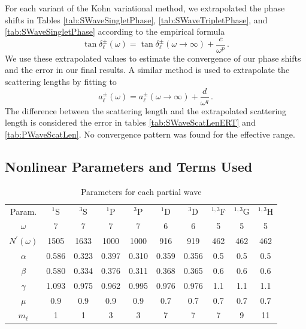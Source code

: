 \documentclass[reprint,showpacs,preprintnumbers,amsmath,amssymb,pra,aps]{revtex4-1}
\begin{document}
For each variant of the Kohn variational method, we extrapolated the phase shifts in Tables \ref{tab:SWaveSingletPhase}, \ref{tab:SWaveTripletPhase}, and \ref{tab:SWaveSingletPhase} according to the empirical formula \cite{VanReeth2003}
\begin{equation}
\label{eq:Extrap}
\tan\delta_\ell^\pm(\omega) = \tan\delta_\ell^\pm(\omega\to\infty) + \frac{c}{\omega^p}\, .
\end{equation}
We use these extrapolated values to estimate the convergence of our phase shifts and the error in our final results.
A similar method is used to extrapolate the scattering lengths by fitting to
\begin{equation}
\label{eq:ExtrapA}
a_\ell^\pm(\omega) = a_\ell^\pm(\omega\to\infty) + \frac{d}{\omega^q}\, .
\end{equation}
The difference between the scattering length and the extrapolated scattering length is considered the error in tables \ref{tab:SWaveScatLenERT} and \ref{tab:PWaveScatLen}. No convergence pattern was found for the effective range.

\subsection{Nonlinear Parameters and Terms Used}
\label{sec:Parameters}

\begin{table}[H]
  \centering
	\begin{ruledtabular}
    \begin{tabular}{cccccccccc}
    Param. & $^1$S & $^3$S & $^1$P & $^3$P & $^1$D & $^3$D & $^{1,3}$F & $^{1,3}$G & $^{1,3}$H \\
    \colrule
	$\omega$           & 7     & 7     & 7     & 7     & 6     & 6     & 5    & 5   & 5 \\
	$N^\prime(\omega)$ & 1505  & 1633  & 1000  & 1000  & 916   & 919   & 462  & 462 & 462 \\
	$\alpha$           & 0.586 & 0.323 & 0.397 & 0.310 & 0.359 & 0.356 & 0.5  & 0.5 & 0.5 \\
	$\beta$            & 0.580 & 0.334 & 0.376 & 0.311 & 0.368 & 0.365 & 0.6  & 0.6 & 0.6 \\
	$\gamma$           & 1.093 & 0.975 & 0.962 & 0.995 & 0.976 & 0.976 & 1.1  & 1.1 & 1.1 \\
	$\mu$              & 0.9   & 0.9   & 0.9   & 0.9   & 0.7   & 0.7   & 0.7  & 0.7 & 0.7 \\
	$m_\ell$           & 1     & 1     & 3     & 3     & 7     & 7     & 7    & 9   & 11 \\
    \end{tabular}
  \end{ruledtabular}
  \caption{Parameters for each partial wave}
  \label{tab:Nonlinear}
\end{table}
\end{document}
